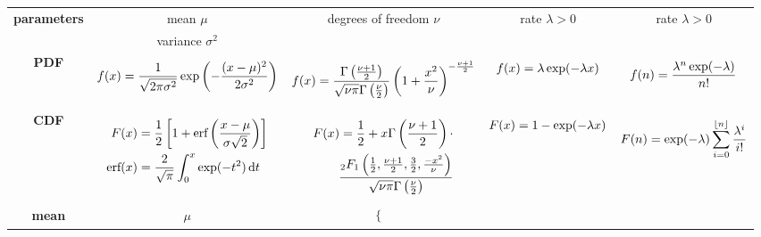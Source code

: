 \documentclass{article}
\begin{document}
\begin{landscape}
\begin{center}
\begin{tabular}{c|c|c|c|c}
				 \\
				\hline
				\multirow{2}{2cm}{\textbf{parameters}}
				& mean $\mu$ & degrees of freedom $\nu$& rate $\lambda>0$& rate $\lambda>0$ \\
				& variance $\sigma^2$ &&& \\
				\hline
				\textbf{PDF} &
				\parbox{3cm}{\begin{align}
					f(x)=\frac{1}{\sqrt{2\pi\sigma^2}}\exp\left(-\frac{(x-\mu)^2}{2\sigma^2}\right)\notag
				\end{align}}
				&
				\parbox{3cm}{\begin{align}
					f(x) = \frac{\Gamma\left(\frac{\nu+1}{2}\right)}{\sqrt{\nu\pi}\Gamma\left(\frac{\nu}{2}\right)}\left(1+\frac{x^2}{\nu}\right)^{-\frac{\nu+1}{2}}\notag
				\end{align}}
				&
				\parbox{3cm}{\begin{align}
					f(x)=\lambda\exp(-\lambda x)\notag
				\end{align}}
				& 
				\parbox{3cm}{\begin{align}
					f(n) = \frac{\lambda^n\exp(-\lambda)}{n!} \notag
				\end{align}}
				\\
				\hline
				\textbf{CDF} &
				\parbox{3cm}{\begin{align}
					F(x)&=\frac{1}{2}\left[1+\text{erf}\left(\frac{x-\mu}{\sigma\sqrt{2}}\right)\right] \\\notag
					\text{erf}(x) &= \frac{2}{\sqrt{\pi}}\int_0^x \exp(-t^2)\,\mathrm{d}t \notag
					\end{align}}
				&
				\parbox{3cm}{\begin{align}
					F(x) = \frac{1}{2}+x\Gamma\left(\frac{\nu+1}{2}\right)\cdot \notag\\
					\frac{_2F_1\left(\frac{1}{2},\frac{\nu+1}{2},\frac{3}{2},\frac{-x^2}{\nu}\right)}{\sqrt{\nu\pi}\Gamma\left(\frac{\nu}{2}\right)} \notag
				\end{align}}
				&
				\parbox{3cm}{\begin{align}
					F(x) = 1-\exp(-\lambda x)\notag
				\end{align}}
				& 
				\parbox{3cm}{\begin{align}
					F(n) = \exp(-\lambda)\sum_{i=0}^{\lfloor n\rfloor}\frac{\lambda^i}{i!}\notag
				\end{align}}
				\\
				\hline
				\textbf{mean} &
				$\mu$
				&
				\parbox{3cm}{\begin{align}
					\begin{cases}

\end{cases}
\end{align}}
\end{tabular}
\end{center}
\end{landscape}
\end{document}
